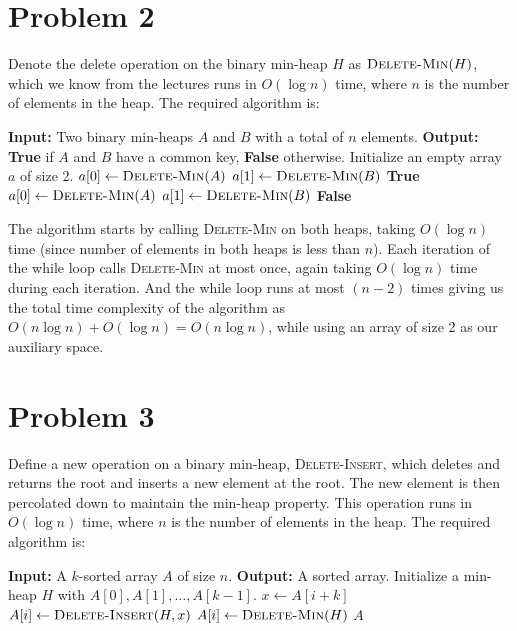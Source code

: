 \documentclass{article}
\begin{document}
\section{Problem 2}
  Denote the delete operation on the binary min-heap $H$ as $\textsc{Delete-Min}(H)$, which we know from the lectures runs in $O(\log n)$ time, where $n$ is the number of elements in the heap.
  The required algorithm is:
  \begin{algorithm}[H]
    \caption{Check if two binary min-heaps have a common key}
    \begin{algorithmic}[1]
      \State \textbf{Input:} Two binary min-heaps $A$ and $B$ with a total of $n$ elements.
      \State \textbf{Output:} \textbf{True} if $A$ and $B$ have a common key, \textbf{False} otherwise.
      \State Initialize an empty array $a$ of size 2.
      \State $a[0] \gets \textsc{Delete-Min}(A)$
      \State $a[1] \gets \textsc{Delete-Min}(B)$
          \State \Return \textbf{True}
          \State $a[0] \gets \textsc{Delete-Min}(A)$
        \Else
          \State $a[1] \gets \textsc{Delete-Min}(B)$
        \EndIf
      \EndWhile
      \State \Return \textbf{False}
    \end{algorithmic}
  \end{algorithm}

  The algorithm starts by calling \textsc{Delete-Min} on both heaps, taking $O(\log n)$ time (since number of elements in both heaps is less than $n$).
  Each iteration of the while loop calls \textsc{Delete-Min} at most once, again taking $O(\log n)$ time during each iteration.
  And the while loop runs at most $(n - 2)$ times giving us the total time complexity of the algorithm as $O(n \log n) + O(\log n) = O(n \log n)$, while using an array of size 2 as our auxiliary space.

\section{Problem 3}
  Define a new operation on a binary min-heap, \textsc{Delete-Insert}, which deletes and returns the root and inserts a new element at the root.
  The new element is then percolated down to maintain the min-heap property.
  This operation runs in $O(\log n)$ time, where $n$ is the number of elements in the heap.
  The required algorithm is:
  \begin{algorithm}[H]
    \caption{Sort a $k$-sorted array}
    \begin{algorithmic}[1]
      \State \textbf{Input:} A $k$-sorted array $A$ of size $n$.
      \State \textbf{Output:} A sorted array.
      \State Initialize a min-heap $H$ with $A[0], A[1], \dots, A[k-1]$.
        \State $x \gets A[i + k]$
        \State $A[i] \gets \textsc{Delete-Insert}(H, x)$
      \EndFor
        \State $A[i] \gets \textsc{Delete-Min}(H)$
      \EndFor
      \State \Return $A$
    \end{algorithmic}
  \end{algorithm}
\end{document}
